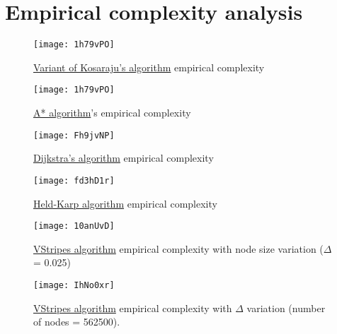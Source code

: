 \chapter{Empirical complexity analysis} \label{empirical}

\begin{figure}[H]
    \centering
    \texttt{[image: 1h79vPO]}
    \caption{\hyperref[algorithm-scc-kosaraju-v]{Variant of Kosaraju's algorithm} empirical complexity}
\end{figure}

\begin{figure}[H]
    \centering
    \texttt{[image: 1h79vPO]}
    \caption{\hyperref[algorithm-shortestpath-astar]{A* algorithm}'s empirical complexity}
\end{figure}


\begin{figure}[H]
    \centering
    \texttt{[image: Fh9jvNP]}
    \caption{\hyperref[algorithm-shortestpath-dijkstra]{Dijkstra's algorithm} empirical complexity}
\end{figure}

\begin{figure}[H]
    \centering
    \texttt{[image: fd3hD1r]}
    \caption{\hyperref[algorithm-tsp-heldkarp]{Held-Karp algorithm} empirical complexity}
\end{figure}

\begin{figure}[H]
    \centering
    \texttt{[image: 10anUvD]}
    \caption{\hyperref[algorithm-vstripes]{VStripes algorithm} empirical complexity with node size variation ($\Delta$ = 0.025)}
\end{figure}

\begin{figure}[H]
    \centering
    \texttt{[image: IhNo0xr]}
    \caption{\hyperref[algorithm-vstripes]{VStripes algorithm} empirical complexity with $\Delta$ variation (number of nodes = 562500).}
\end{figure}

